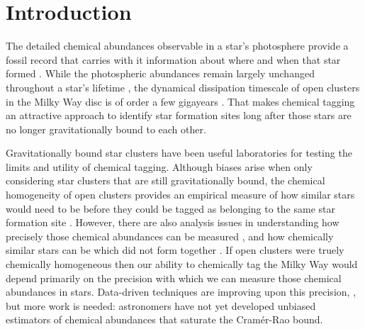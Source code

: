 \documentclass[twocolumn]{aastex62}
\begin{document}

\section{Introduction} \label{sec:intro}

The detailed chemical abundances observable in a star's photosphere provide a
fossil record that carries with it information about where and when that star
formed \citep{Freeman;Bland-Hawthorn:2002}. While the photospheric abundances remain largely unchanged throughout
a star's lifetime \citep[however see][]{Dotter:2017,Ness:2018b}, the dynamical 
dissipation timescale of open clusters in the Milky Way disc is of order a few 
gigayears \citep{Portegies-Zwart:1998}. That makes chemical tagging an attractive 
approach to identify star formation sites long after those stars are no longer 
gravitationally bound to each other.


Gravitationally bound star clusters have been useful laboratories for
testing the limits and utility of chemical tagging. Although biases arise when
only considering star clusters that are still gravitationally bound, the chemical
homogeneity of open clusters provides an empirical measure of how similar stars
would need to be before they could be tagged as belonging to the same
star formation site \citep{Mitschang:2014}. However, there are also analysis
issues in understanding how precisely those chemical abundances can be measured
\citep{Bovy:2016}, and how chemically similar stars can be which did not form 
together \citep[doppleg\"angers;][]{Ness:2018}.
If open clusters were truely chemically homogeneous then our
ability to chemically tag the Milky Way would depend primarily on the precision with which we
can measure those chemical abundances in stars. Data-driven techniques are
improving upon this precision, \citep{Ness:2015,Ness:2018a,Ness:2018b,
Casey:2016,Casey:2017,Ho:2017b,Ho:2017a,Leung;Bovy:2018}, but more work is
needed: astronomers have not yet developed unbiased estimators of chemical
abundances that saturate the Cram\'er-Rao bound.
\end{document}
